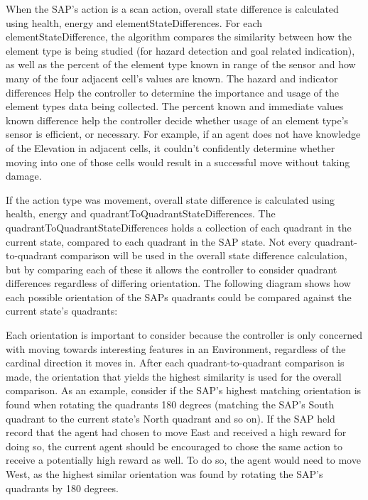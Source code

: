 When the SAP's action is a scan action, overall state difference is calculated using health, energy and elementStateDifferences.
For each elementStateDifference, the algorithm compares the similarity between how the element type is being studied (for hazard detection and goal related indication), as well as the percent of the element type known in range of the sensor and how many of the four adjacent cell's values are known.
The hazard and indicator differences Help the controller to determine the importance and usage of the element types data being collected.
The percent known and immediate values known difference help the controller decide whether usage of an element type's sensor is efficient, or necessary.
For example, if an agent does not have knowledge of the Elevation in adjacent cells, it couldn't confidently determine whether moving into one of those cells would result in a successful move without taking damage.

If the action type was movement, overall state difference is calculated using health, energy and quadrantToQuadrantStateDifferences.
The quadrantToQuadrantStateDifferences holds a collection of each quadrant in the current state, compared to each quadrant in the SAP state.
Not every quadrant-to-quadrant comparison will be used in the overall state difference calculation, but by comparing each of these it allows the controller to consider quadrant differences regardless of differing orientation.
The following diagram shows how each possible orientation of the SAPs quadrants could be compared against the current state's quadrants:


Each orientation is important to consider because the controller is only concerned with moving towards interesting features in an Environment, regardless of the cardinal direction it moves in.
After each quadrant-to-quadrant comparison is made, the orientation that yields the highest similarity is used for the overall comparison.
As an example, consider if the SAP's highest matching orientation is found when rotating the quadrants 180 degrees (matching the SAP's South quadrant to the current state's North quadrant and so on).
If the SAP held record that the agent had chosen to move East and received a high reward for doing so, the current agent should be encouraged to chose the same action to receive a potentially high reward as well.
To do so, the agent would need to move West, as the highest similar orientation was found by rotating the SAP's quadrants by 180 degrees.


